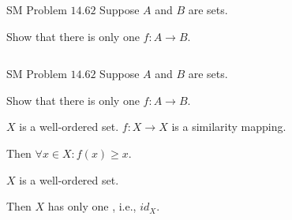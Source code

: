 \begin{frame}{}
  \begin{exampleblock}{SM Problem $14.62$}
    Suppose $A$ and $B$ are   sets. 
    
    Show that there is only one  $f : A \to B$.
  \end{exampleblock}

  \vspace{0.40cm}
  \begin{columns}
      \pause
  \end{columns}
\end{frame}


\begin{frame}{}
  \begin{exampleblock}{SM Problem $14.62$}
    Suppose $A$ and $B$ are   sets. 
    
    Show that there is only one  $f : A \to B$.
  \end{exampleblock}

  \pause
  \vspace{0.50cm}
  \begin{lemma}
    $X$ is a well-ordered set. $f: X \to X$ is a similarity mapping.

    Then $\forall x \in X: f(x) \ge x$.
  \end{lemma}
  
  \pause
  \vspace{0.50cm}
  \begin{lemma}
    $X$ is a well-ordered set. 

    Then $X$ has only one , i.e., $id_X$.
  \end{lemma}
\end{frame}

